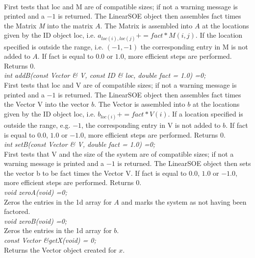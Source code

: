 \\
First tests that \p loc and \p M are of compatible sizes; if not
a warning message is printed and a $-1$ is returned. The LinearSOE
object then assembles \p fact times the Matrix {\em 
M} into the matrix $A$. The Matrix is assembled into $A$ at the
locations given by the ID object \p loc, i.e. $a_{loc(i),loc(j)} +=
fact * M(i,j)$. If the location specified is outside the range,
i.e. $(-1,-1)$ the corresponding entry in \p M is not added to
$A$. If \p fact is equal to $0.0$ or $1.0$, more efficient steps
are performed. Returns $0$.  \\


{\em int addB(const Vector \& V, const ID \& loc,
double fact = 1.0) =0;} \\
First tests that \p loc and \p V are of compatible sizes; if not
a warning message is printed and a $-1$ is returned. The LinearSOE
object then assembles \p fact times the Vector \p V into
the vector $b$. The Vector is assembled into $b$ at the locations
given by the ID object \p loc, i.e. $b_{loc(i)} += fact * V(i)$. If a
location specified is outside the range, e.g. $-1$, the corresponding
entry in \p V is not added to $b$. If \p fact is equal to $0.0$,
$1.0$ or $-1.0$, more efficient steps are performed. Returns $0$. \\

{\em int setB(const Vector \& V, double fact = 1.0) =0;} \\
First tests that \p V and the size of the system are of compatible
sizes; if not a warning message is printed and a $-1$ is returned. The
LinearSOE object then sets the vector \p b to be \p fact times
the Vector \p V. If \p fact is equal to $0.0$, $1.0$ or $-1.0$,
more efficient steps are performed. Returns $0$. \\ 

{\em void zeroA(void) =0;} \\
Zeros the entries in the 1d array for $A$ and marks the system as not
having been factored. \\

{\em void zeroB(void) =0;} \\
Zeros the entries in the 1d array for $b$. \\

{\em const Vector \&getX(void) = 0;} \\
Returns the Vector object created for $x$. \\

